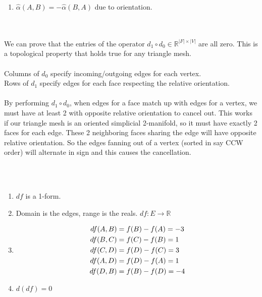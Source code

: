 \documentclass{article}
\begin{document}
\begin{enumerate}[label=(\alph*)]
    \item
    $\hat{\alpha}(A, B) = -\hat{\alpha}(B, A)$ due to orientation.
\end{enumerate}


\vspace{1.8cm}
\\\\

We can prove that the entries of the operator $d_1 \circ d_0 \in \mathbb{R}^{|F| \times |V|}$ are all zero. This
is a topological property that holds true for any triangle mesh.\\\\
Columns of $d_0$ specify incoming/outgoing edges for each vertex.\\
Rows of $d_1$ specify edges for each face respecting the relative orientation.\\\\
By performing $d_1 \circ d_0$, when edges for a face match up with edges for a vertex, we must
have at least 2 with opposite relative orientation to cancel out. This works if our triangle mesh is an oriented simplicial 2-manifold,
so it must have exactly 2 faces for each edge. These 2 neighboring faces sharing the edge will have opposite relative orientation.
So the edges fanning out of a vertex (sorted in say CCW order) will alternate in sign and this causes the cancellation.


\pagebreak
{}\\\\

\begin{enumerate}[label=(\alph*)]
    \item $df$ is a 1-form.
    \item Domain is the edges, range is the reals. $df : E \rightarrow \mathbb{R}$
    \item 
    \begin{align}
        df(A, B) &= f(B) - f(A) = -3 \notag\\
        df(B, C) &= f(C) - f(B) = 1 \notag\\
        df(C, D) &= f(D) - f(C) = 3 \notag\\
        df(A, D) &= f(D) - f(A) = 1 \notag\\
        df(D, B) &= f(B) - f(D) = -4 \notag
    \end{align}
    \item $d(df) = 0$
\end{enumerate}
\end{document}
